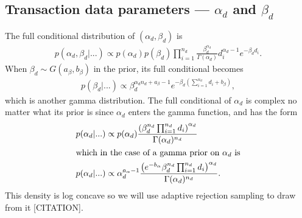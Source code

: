 \documentclass{article}
\begin{document}
\subsection{Transaction data parameters --- $\alpha_d$ and $\beta_d$}
The full conditional distribution of $(\alpha_d,\beta_d)$ is 
\begin{align*}
p(\alpha_d,\beta_d|...) \propto p(\alpha_d)p(\beta_d) \prod_{i=1}^{n_d}\frac{\beta_d^{\alpha_d}}{\Gamma(\alpha_d)}d_i^{\alpha_d - 1}e^{-\beta_dd_i}.
\end{align*}
When $\beta_d \sim G(a_\beta, b_\beta)$ in the prior, its full conditional becomes
\begin{align*}
p(\beta_d|...) \propto \beta_d^{\alpha_dn_d + a_{\beta} - 1}e^{-\beta_d\left(\sum_{i=1}^{n_d}d_i + b_{\beta}\right)},
\end{align*}
which is another gamma distribution. The full conditional of $\alpha_d$ is complex no matter what its prior is since $\alpha_d$ enters the gamma function, and has the form
\begin{align*}
p(\alpha_d|...) &\propto p(\alpha_d)\frac{\left(\beta_d^{n_d}\prod_{i=1}^{n_d}d_i\right)^{\alpha_d}}{\Gamma(\alpha_d)^{n_d}}\\
\intertext{which in the case of a gamma prior on $\alpha_d$ is}
p(\alpha_d|...) &\propto \alpha_d^{a_\alpha - 1}\frac{\left(e^{-b_\alpha}\beta_d^{n_d}\prod_{i=1}^{n_d}d_i\right)^{\alpha_d}}{\Gamma(\alpha_d)^{n_d}}.
\end{align*}
This density is log concave so we will use adaptive rejection sampling to draw from it [CITATION].
 

\end{document}
